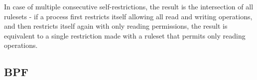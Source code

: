 In case of multiple consecutive self-restrictions, the result is the intersection
of all rulesets - if a process first restricts itself allowing all read and writing operations,
and then restricts itself again with only reading permissions, the result is equivalent
to a single restriction made with a ruleset that permits only reading operations.

\subsection{BPF}